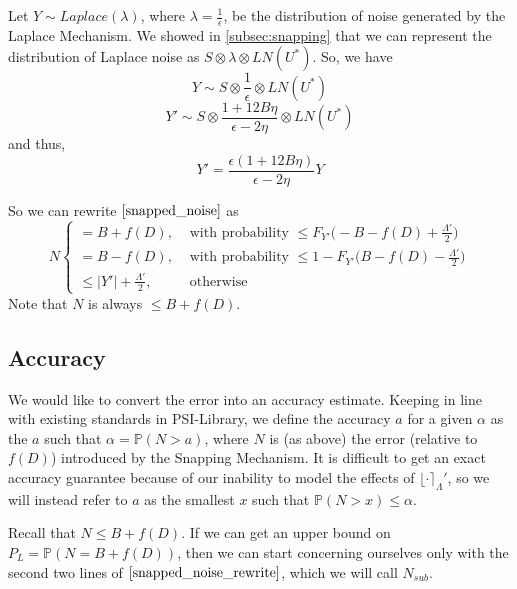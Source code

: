 \documentclass[11pt]{scrartcl} %
\begin{document}
Let $Y \sim Laplace(\lambda)$, where $\lambda = \frac{1}{\epsilon}$, be the distribution of noise generated by the Laplace Mechanism.
We showed in \autoref{subsec:snapping} that we can represent the distribution of Laplace noise as $S \otimes \lambda \otimes LN(U^*)$. So, we have
\[ Y \sim S \otimes \frac{1}{\epsilon} \otimes LN(U^*) \]
\[ Y' \sim S \otimes \frac{1 + 12B\eta}{\epsilon - 2\eta} \otimes LN(U^*) \]
and thus,
\[ Y' = \frac{\epsilon(1 + 12B\eta)}{\epsilon - 2\eta}Y \]

So we can rewrite $\eqref{snapped_noise}$ as
\begin{equation}
	\label{snapped_noise_rewrite}
	N
		\begin{cases}
			= B + f(D), &\text{ with probability } \leq F_{Y'} \big( -B - f(D) + \frac{\Lambda'}{2} \big)  \\
			= B - f(D), &\text{ with probability } \leq 1 - F_{Y'} \big( B - f(D) - \frac{\Lambda'}{2} \big)  \\
			\leq \vert Y' \vert + \frac{\Lambda'}{2}, &\text{ otherwise }
		\end{cases}
\end{equation}
Note that $N$ is always $\leq B + f(D)$.

\subsection{Accuracy}
\label{subsec:accuracy}
We would like to convert the error into an accuracy estimate. Keeping in line with existing standards in PSI-Library, we define the accuracy $a$ for a given $\alpha$ as the $a$ such that $\alpha = \mathbb{P}(N > a)$, where $N$ is (as above) the error (relative to $f(D)$) introduced by the Snapping Mechanism. It is difficult to get an exact accuracy guarantee because of our inability to model the effects of $\lfloor \cdot \rceil_\Lambda'$, so we will instead refer to $a$ as the smallest $x$ such that $\mathbb{P}(N > x) \leq \alpha$. \newline

Recall that $N \leq B + f(D)$. If we can get an upper bound on $P_{L} = \mathbb{P}(N = B + f(D))$, then we can start concerning ourselves only with the second two lines of $\eqref{snapped_noise_rewrite}$, which we will call $N_{sub}$. \newline
\end{document}
